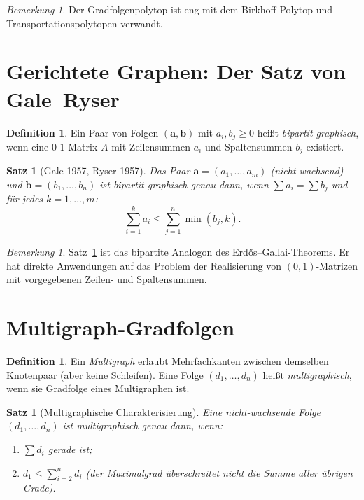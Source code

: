 \documentclass[12pt,a4paper]{amsart}
\newtheorem{satz}[theorem]{Satz}
\theoremstyle{definition}
\newtheorem{definition_de}[theorem]{Definition}
\theoremstyle{remark}
\newtheorem{bemerkung}[theorem]{Bemerkung}
\begin{document}
\begin{bemerkung}
Der Gradfolgenpolytop ist eng mit dem Birkhoff-Polytop und
Transportationspolytopen verwandt.
\end{bemerkung}

\section{Gerichtete Graphen: Der Satz von Gale--Ryser}

\begin{definition_de}
Ein Paar von Folgen $(\mathbf{a}, \mathbf{b})$ mit $a_i, b_j \geq 0$ heißt
\emph{bipartit graphisch}, wenn eine $0$-$1$-Matrix $A$ mit Zeilensummen $a_i$
und Spaltensummen $b_j$ existiert.
\end{definition_de}

\begin{satz}[Gale 1957, Ryser 1957]
\label{satz:GR}
Das Paar $\mathbf{a} = (a_1, \ldots, a_m)$ (nicht-wachsend) und
$\mathbf{b} = (b_1, \ldots, b_n)$ ist bipartit graphisch genau dann, wenn
$\sum a_i = \sum b_j$ und für jedes $k = 1, \ldots, m$:
\[
  \sum_{i=1}^k a_i \leq \sum_{j=1}^n \min(b_j, k).
\]
\end{satz}

\begin{bemerkung}
Satz~\ref{satz:GR} ist das bipartite Analogon des Erd\H{o}s--Gallai-Theorems.
Er hat direkte Anwendungen auf das Problem der Realisierung von $(0,1)$-Matrizen
mit vorgegebenen Zeilen- und Spaltensummen.
\end{bemerkung}

\section{Multigraph-Gradfolgen}

\begin{definition_de}
Ein \emph{Multigraph} erlaubt Mehrfachkanten zwischen demselben Knotenpaar
(aber keine Schleifen).
Eine Folge $(d_1, \ldots, d_n)$ heißt \emph{multigraphisch}, wenn sie
Gradfolge eines Multigraphen ist.
\end{definition_de}

\begin{satz}[Multigraphische Charakterisierung]
Eine nicht-wachsende Folge $(d_1, \ldots, d_n)$ ist multigraphisch genau dann, wenn:
\begin{enumerate}[label=(\roman*)]
  \item $\sum d_i$ gerade ist;
  \item $d_1 \leq \sum_{i=2}^n d_i$ (der Maximalgrad überschreitet nicht die
        Summe aller übrigen Grade).
\end{enumerate}
\end{satz}
\end{document}
